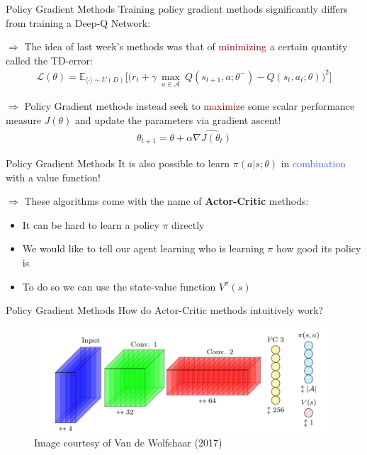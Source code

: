 \documentclass{beamer}
\begin{document}
\begin{frame}{Policy Gradient Methods}
	Training policy gradient methods significantly differs from training a Deep-Q Network:
	
	\bigskip

	$\Rightarrow$ The idea of last week's methods was that of \textcolor{Maroon}{minimizing} a certain quantity called the TD-error:
	\begin{align*}
		\mathcal{L}(\theta) = \mathds{E}_{\langle \cdot \rangle\sim U(D)} \bigg[\big(r_{t} + \gamma \: \underset{a\in \mathcal{A}}{\max}\: Q(s_{t+1}, a; \theta^{-}) - Q(s_{t}, a_{t}; \theta)\big)^{2}\bigg]
	\end{align*}

	
	\bigskip

	$\Rightarrow$ Policy Gradient methods instead seek to \textcolor{Maroon}{maximize} some scalar performance measure $J(\theta)$ and update the parameters via gradient ascent!
	\begin{align*}
		\theta_{t+1} = \theta + \alpha \widehat{\nabla J(\theta_t)}
	\end{align*}

\end{frame}


\begin{frame}{Policy Gradient Methods}
	It is also possible to learn $\pi(a|s;\theta)$ in \textcolor{RoyalBlue}{combination} with a value function!

	\bigskip

	$\Rightarrow$ These algorithms come with the name of \textcolor{skymagenta}{\textbf{Actor-Critic}} methods:
	\begin{itemize}
		\item It can be hard to learn a policy $\pi$ directly
		\item We would like to tell our agent learning who is learning $\pi$ how good its policy is 
		\item To do so we can use the state-value function $V^{\pi}(s)$
	\end{itemize}
\end{frame}


\begin{frame}{Policy Gradient Methods}
	How do Actor-Critic methods intuitively work?
		\begin{center}
			\begin{figure}
			\includegraphics[width=\textwidth]{./Images/a2c}
			\caption{Image courtesy of Van de Wolfshaar (2017)}
			\end{figure}
		\end{center}
\end{frame}
\end{document}
